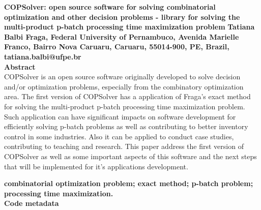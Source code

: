 \documentclass[11pt, letterpaper]{article}
\begin{document}
\noindent
\textbf{COPSolver: open source software for solving combinatorial optimization and other decision problems - library for solving the multi-product p-batch processing time maximization problem}
\vskip0.5cm
\noindent
\textbf{Tatiana Balbi Fraga, Federal University of Pernambuco, Avenida Marielle
Franco, Bairro Nova Caruaru, Caruaru, 55014-900, PE, Brazil, tatiana.balbi@ufpe.br}\\

\noindent
\textbf{Abstract}\\
COPSolver is an open source software originally developed to solve decision and/or optimization problems, especially from the combinatory optimization area. The first version of COPSolver has a application of Fraga's exact method for solving the multi-product p-batch processing time maximization problem. Such application can have significant impacts on software development for efficiently solving p-batch problems as well as contributing to better inventory control in some industries. Also it can be applied to conduct case studies, contributing to teaching and research. This paper address the first version of COPSolver as well as some important aspects of this software and the next steps that will be implemented for it's applications development.
\vskip0.5cm

\noindent
\textbf{combinatorial optimization problem; exact method; p-batch problem; processing time maximization.}\\
\vskip0.5cm
\newpage
\noindent
\textbf{Code metadata}\\
\end{document}
